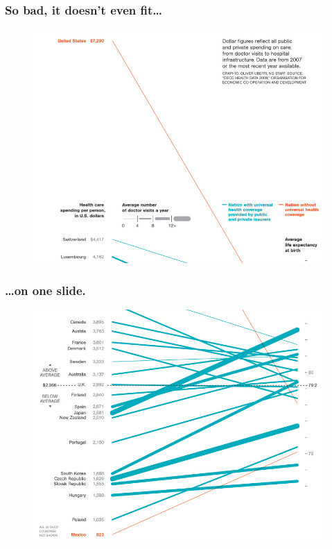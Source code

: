 \documentclass{beamer}
\begin{document}
\begin{frame}
    \frametitle{So bad, it doesn't even fit\ldots}
    \begin{figure}
        \centering
        \includegraphics[width=0.8\paperwidth]{top.jpg}
    \end{figure}
\end{frame}

\begin{frame}
    \frametitle{\ldots on one slide.}
    \begin{figure}
        \centering
        \includegraphics[width=0.8\paperwidth]{bottom.jpg}
    \end{figure}
\end{frame}
\end{document}
